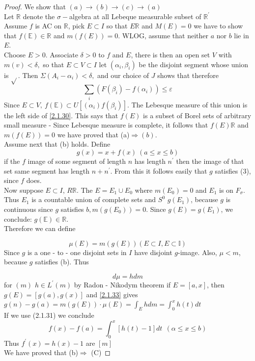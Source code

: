 \documentclass[a4 paper, 12pt]{report}
\theoremstyle{plain}
\begin{document}
\begin{proof}
We show that $(a)\rightarrow(b)\rightarrow(c)\rightarrow(a)$\\
Let $\mathbb{R}$ denote the $\sigma-$algebra at all Lebeque measurable subset of $\mathbb{R}^\prime$\\
Assume $f$ is AC on $\mathbb{R}$, pick $E\subset I$ so that $E\mathbb{R}$ and $M(E) = 0$ we have to show that $f(\mathbb{E})\in\mathbb{R}$ and $m(f(E)) = 0$. WLOG, assume that neither $a$ nor $b$ lie in $E$.\\
Choose $E>0$. Associate $\delta>0$ to $f$ and $E$, there is then an open set $V$ with $m(v)<\delta,$ so that $E\subset V\subset I$ let $(\alpha_i,\beta_i)$ be the disjoint segment  whose union is $\sqrt{}$. Then $\Sigma(A_i-\alpha_i)<\delta,$ and our choice of $J$ shows that therefore
\begin{equation}\label{2.1.30}
\sum_i(F(\beta_i) - f(\alpha_i))\leq \varepsilon
\end{equation}
Since $E\subset V,~f(\mathbb{E})\subset U[(\alpha_i)f(\beta_i)]$. The Lebesque measure of this union is the left side of \eqref{2.1.30}. This says that $f(E)$ is a subset of Borel sets of arbitrary small measure  - Since Lebesque measure is complete, it follows that $f(E)\mathbb{R}$ and $m(f(E)) = 0$ we have proved that (a)$\Rightarrow (b)$.\\
Assume next that (b) holds. Define
\begin{equation}\label{2.1.31}
g(x) = x+f(x)~(a\leq x\leq b)
\end{equation}
if the $f$ image of some segment of length $n$ has length $n^\prime$ then the image of that set same segment has length $n+n^\prime$. From this it follows easily that $g$ satisfies  (3), since $f$ does.\\
Now suppose $E\subset I$, $R\mathbb{R}$. The  $E = E_1\cup E_0$ where $m(E_0) = 0$ and $E_1$ is on $F_\sigma$. Thus $E_1$ is a countable union of complete sets and $S^0$ $g(E_1)$, because $g$ is continuous since $g$ satisfies $b,m(g(E_0)) = 0$. Since $g(E) = g(E_1)$, we conclude: $g(\mathbb{E})\in\mathbb{R}$.\\
Therefore we can define

\begin{equation}\label{2.1.32}
\mu(E) = m(g(E))(E\subset I, E\subset\mathbb{I})
\end{equation}
Since $g$ is a one - to - one disjoint  sets in $I$ have disjoint $g$-image. Also, $\mu< m$, because $g$ satisfies (b). Thus

\begin{equation}\label{2.1.33}
d\mu = hdm
\end{equation}
for $(m)$ $h\in L^\prime(m)$ by Radon - Nikodym theorem if $E = [a,x]$, then $g(E) = [g(a),g(x)]$ and \eqref{2.1.33} gives $g(n) - g(a) = m(g(E))\cdot \mu(E) = \int_E hdm = \int_0^x h(t)dt$\\
If we use (2.1.31) we conclude
\begin{equation}\label{2.1.36}
f(x) - f(a) = \int_0^x[h(t) - 1]dt~~(\alpha\leq x\leq b)
\end{equation}
Thus $f^\prime(x) = h(x) - 1$ are $[m]$\\
We have proved that (b)$\Rightarrow$ (C)
\end{proof}
\end{document}
